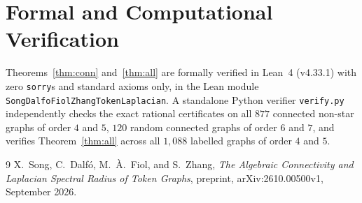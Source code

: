 \documentclass[11pt]{article}
\begin{document}
\section{Formal and Computational Verification}

Theorems~\ref{thm:conn} and~\ref{thm:all} are formally verified in Lean~4
(v4.33.1) with zero \texttt{sorry}s and standard axioms only, in the Lean
module \texttt{SongDalfoFiolZhangTokenLaplacian}. A standalone Python verifier
\texttt{verify.py} independently checks the exact rational certificates on all
$877$ connected non-star graphs of order $4$ and $5$, $120$ random connected
graphs of order $6$ and $7$, and verifies Theorem~\ref{thm:all} across all
$1{,}088$ labelled graphs of order $4$ and $5$.

\begin{thebibliography}{9}
X.~Song, C.~Dalf\'o, M.~\`A.~Fiol, and S.~Zhang,
\emph{The Algebraic Connectivity and Laplacian Spectral Radius of Token Graphs},
preprint, arXiv:2610.00500v1, September 2026.
\end{thebibliography}
\end{document}
